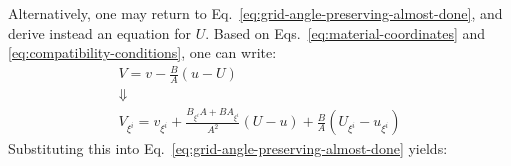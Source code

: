 Alternatively, one may return to Eq.~\ref{eq:grid-angle-preserving-almost-done}, and derive instead an equation for $U$. Based on Eqs.~\ref{eq:material-coordinates} and \ref{eq:compatibility-conditions}, one can write:
\[\begin{array}{c}
V = v - \frac{B}{A}\left( {u - U} \right)\\
 \Downarrow \\
{V_{{\xi ^i}}} = {v_{{\xi ^i}}} + \frac{{{B_{{\xi ^i}}}A + B{A_{{\xi ^i}}}}}{{{A^2}}}\left( {U - u} \right) + \frac{B}{A}\left( {{U_{{\xi ^i}}} - {u_{{\xi ^i}}}} \right)
\end{array}\]
Substituting this into Eq.~\ref{eq:grid-angle-preserving-almost-done} yields:
